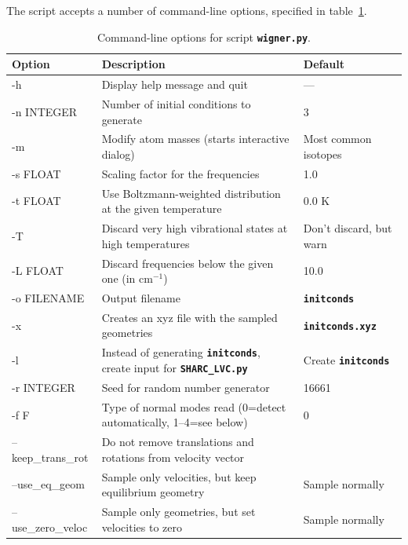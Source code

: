 \documentclass[a4paper,10pt,DIV=15,openany,twoside=false]{scrbook}
\newcommand{\ttt}[1]{\textbf{\texttt{#1}}}
\begin{document}
The script accepts a number of command-line options, specified in table~\ref{tab:wigner_opts}.
\begin{table}
  \centering
  \caption{Command-line options for script \ttt{wigner.py}.}
  \label{tab:wigner_opts}
  \begin{tabular}{>{\ttfamily}lp{9cm}l}
    \toprule
    \rmfamily Option        &Description      &Default\\
    \midrule
    -h                  &Display help message and quit              &---                            \\
    -n  INTEGER         &Number of initial conditions to generate   &3                              \\
    -m                  &Modify atom masses (starts interactive dialog)  &Most common isotopes      \\
    -s  FLOAT           &Scaling factor for the frequencies         &1.0                            \\
    -t  FLOAT           &Use Boltzmann-weighted distribution at the given temperature   &0.0 K\\
    -T                  &Discard very high vibrational states at high temperatures      &Don't discard, but warn\\
    -L  FLOAT           &Discard frequencies below the given one (in cm$^{-1}$)         &10.0\\
    -o  FILENAME        &Output filename                            &\ttt{initconds}                \\
    -x                  &Creates an xyz file with the sampled geometries &\ttt{initconds.xyz}       \\
    -l                  &Instead of generating \ttt{initconds}, create input for \ttt{SHARC\_LVC.py}    &Create \ttt{initconds}\\
    -r  INTEGER         &Seed for random number generator           &16661                          \\
    -f F                &Type of normal modes read (0=detect automatically, 1--4=see below)     &0\\
    --keep\_trans\_rot  &Do not remove translations and rotations from velocity vector &\\
    --use\_eq\_geom     &Sample only velocities, but keep equilibrium geometry  &Sample normally\\
    --use\_zero\_veloc  &Sample only geometries, but set velocities to zero     &Sample normally\\
    \bottomrule
  \end{tabular}
\end{table}
\end{document}
